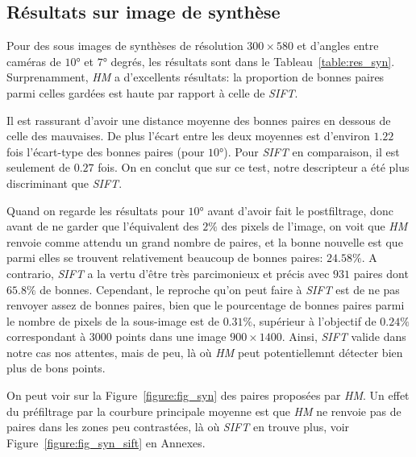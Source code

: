 \documentclass[
	a4paper, %
	10pt, %
	unnumberedsections, %
	twoside, %
]{LTJournalArticle}
\begin{document}
\subsection{Résultats sur image de synthèse}

Pour des sous images de synthèses de résolution $300 \times 580$ et
d'angles entre caméras de $10$° et $7$° degrés, les résultats sont dans le Tableau~\ref{table:res_syn}.
Surprenamment, \textit{HM} a d'excellents résultats: la proportion de bonnes paires parmi celles gardées
est haute par rapport à celle de \textit{SIFT}.

Il est rassurant d'avoir une distance moyenne des bonnes paires en dessous de celle des mauvaises.
De plus l'écart entre les deux moyennes est d'environ $1.22$ fois l'écart-type des bonnes paires (pour $10$°). Pour \textit{SIFT} en comparaison,
il est seulement de $0.27$ fois.
On en conclut que sur ce test, notre descripteur a été plus discriminant que \textit{SIFT}.

Quand on regarde les résultats pour $10$° avant d'avoir fait le postfiltrage, donc avant de ne garder que l'équivalent des $2\%$ des pixels de l'image,
on voit que \textit{HM} renvoie comme attendu un grand nombre de paires, et la bonne nouvelle est que parmi elles se trouvent relativement beaucoup
de bonnes paires: $24.58\%$. A contrario, \textit{SIFT} a la vertu d'être très parcimonieux et précis avec $931$ paires dont $65.8\%$ de bonnes.
Cependant, le reproche qu'on peut faire à \textit{SIFT} est de ne pas renvoyer assez de bonnes paires, bien que le pourcentage de bonnes paires
parmi le nombre de pixels de la sous-image est de $0.31\%$, supérieur à l'objectif de $0.24\%$ correspondant à 3000 points dans une
image $900 \times 1400$. Ainsi, \textit{SIFT} valide dans notre cas nos attentes, mais de peu, là où \textit{HM} peut potentiellemnt détecter bien
plus de bons points.

On peut voir sur la Figure~\ref{figure:fig_syn} des paires proposées par \textit{HM}.
Un effet du préfiltrage par la courbure principale moyenne est que \textit{HM} ne renvoie pas
de paires dans les zones peu contrastées, là où \textit{SIFT} en trouve plus, voir Figure~\ref{figure:fig_syn_sift}
en Annexes.
\end{document}
